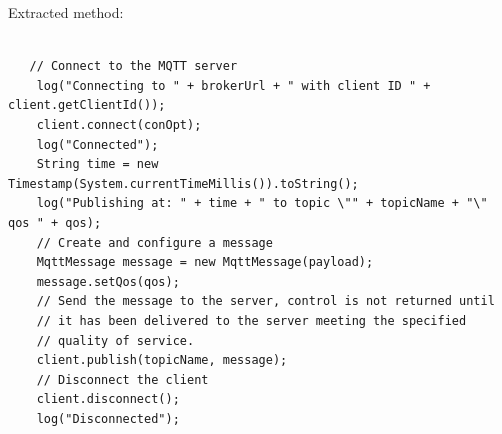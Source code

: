 \vspace{5mm}
\newpage
Extracted method:
\begin{lstlisting}

   // Connect to the MQTT server
    log("Connecting to " + brokerUrl + " with client ID " + client.getClientId());
    client.connect(conOpt);
    log("Connected");
    String time = new Timestamp(System.currentTimeMillis()).toString();
    log("Publishing at: " + time + " to topic \"" + topicName + "\" qos " + qos);
    // Create and configure a message
    MqttMessage message = new MqttMessage(payload);
    message.setQos(qos);
    // Send the message to the server, control is not returned until
    // it has been delivered to the server meeting the specified
    // quality of service.
    client.publish(topicName, message);
    // Disconnect the client
    client.disconnect();
    log("Disconnected");
 \end{lstlisting}

